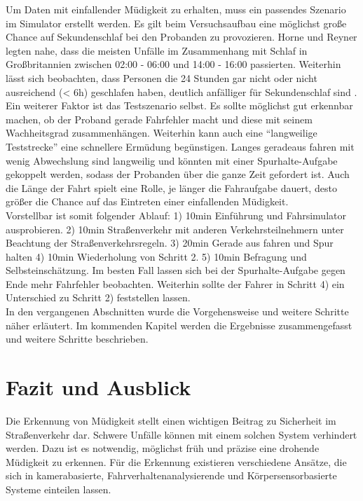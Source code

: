 {Um Daten mit einfallender Müdigkeit zu erhalten, muss ein passendes Szenario im Simulator erstellt werden. Es gilt beim Versuchsaufbau eine möglichst große Chance auf Sekundenschlaf bei den Probanden zu provozieren. Horne und Reyner \cite{Horne_1757738} legten nahe, dass die meisten Unfälle im Zusammenhang mit Schlaf in Großbritannien zwischen 02:00 - 06:00 und 14:00 - 16:00 passierten. Weiterhin lässt sich beobachten, dass Personen die 24 Stunden gar nicht oder nicht ausreichend (< 6h) geschlafen haben, deutlich anfälliger für Sekundenschlaf sind \cite{Peters_1}. 
Ein weiterer Faktor ist das Testszenario selbst. Es sollte möglichst gut erkennbar machen, ob der Proband gerade Fahrfehler macht und diese mit seinem Wachheitsgrad zusammenhängen. Weiterhin kann auch eine "`langweilige Teststrecke"' eine schnellere Ermüdung begünstigen. Langes geradeaus fahren mit wenig Abwechslung sind langweilig und könnten mit einer Spurhalte-Aufgabe gekoppelt werden, sodass der Probanden über die ganze Zeit gefordert ist. Auch die Länge der Fahrt spielt eine Rolle, je länger die Fahraufgabe dauert, desto größer die Chance auf das Eintreten einer einfallenden Müdigkeit. \\

Vorstellbar ist somit folgender Ablauf: 1) 10min Einführung und Fahrsimulator ausprobieren. 2) 10min Straßenverkehr mit anderen Verkehrsteilnehmern unter Beachtung der Straßenverkehrsregeln. 3) 20min Gerade aus fahren und Spur halten 4) 10min Wiederholung von Schritt 2. 5) 10min Befragung und Selbsteinschätzung.
Im besten Fall lassen sich bei der Spurhalte-Aufgabe gegen Ende mehr Fahrfehler beobachten. Weiterhin sollte der Fahrer in Schritt 4) ein Unterschied zu Schritt 2) feststellen lassen.\\

In den vergangenen Abschnitten wurde die Vorgehensweise und weitere Schritte näher erläutert. Im kommenden Kapitel werden die Ergebnisse zusammengefasst und weitere Schritte beschrieben.


\section{Fazit und Ausblick}
\label{chap:outro}
Die Erkennung von Müdigkeit stellt einen wichtigen Beitrag zu Sicherheit im Straßenverkehr dar. Schwere Unfälle können mit einem solchen System verhindert werden. Dazu ist es notwendig, möglichst früh und präzise eine drohende Müdigkeit zu erkennen. Für die Erkennung existieren verschiedene Ansätze, die sich in kamerabasierte, Fahrverhaltenanalysierende und Körpersensorbasierte Systeme einteilen lassen. \\

}
